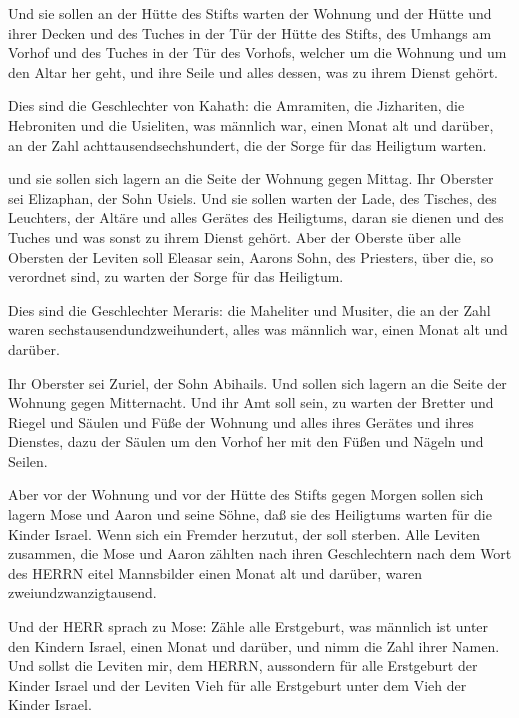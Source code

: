  Und sie sollen an der Hütte des Stifts warten der Wohnung
und der Hütte und ihrer Decken und des Tuches in der Tür der Hütte des
Stifts,  des Umhangs am Vorhof und des Tuches in der Tür
des Vorhofs, welcher um die Wohnung und um den Altar her geht, und ihre
Seile und alles dessen, was zu ihrem Dienst gehört.

 Dies sind die Geschlechter von Kahath: die Amramiten, die
Jizhariten, die Hebroniten und die Usieliten,  was männlich
war, einen Monat alt und darüber, an der Zahl achttausendsechshundert,
die der Sorge für das Heiligtum warten.

 und sie sollen sich lagern an die Seite der Wohnung gegen
Mittag.  Ihr Oberster sei Elizaphan, der Sohn Usiels.
 Und sie sollen warten der Lade, des Tisches, des
Leuchters, der Altäre und alles Gerätes des Heiligtums, daran sie dienen
und des Tuches und was sonst zu ihrem Dienst gehört.  Aber
der Oberste über alle Obersten der Leviten soll Eleasar sein, Aarons
Sohn, des Priesters, über die, so verordnet sind, zu warten der Sorge
für das Heiligtum.

 Dies sind die Geschlechter Meraris: die Maheliter und
Musiter,  die an der Zahl waren sechstausendundzweihundert,
alles was männlich war, einen Monat alt und darüber.

 Ihr Oberster sei Zuriel, der Sohn Abihails. Und sollen
sich lagern an die Seite der Wohnung gegen Mitternacht. 
Und ihr Amt soll sein, zu warten der Bretter und Riegel und Säulen und
Füße der Wohnung und alles ihres Gerätes und ihres Dienstes,
 dazu der Säulen um den Vorhof her mit den Füßen und Nägeln
und Seilen.

 Aber vor der Wohnung und vor der Hütte des Stifts gegen
Morgen sollen sich lagern Mose und Aaron und seine Söhne, daß sie des
Heiligtums warten für die Kinder Israel. Wenn sich ein Fremder herzutut,
der soll sterben.  Alle Leviten zusammen, die Mose und
Aaron zählten nach ihren Geschlechtern nach dem Wort des HERRN eitel
Mannsbilder einen Monat alt und darüber, waren zweiundzwanzigtausend.

 Und der HERR sprach zu Mose: Zähle alle Erstgeburt, was
männlich ist unter den Kindern Israel, einen Monat und darüber, und nimm
die Zahl ihrer Namen.  Und sollst die Leviten mir, dem
HERRN, aussondern für alle Erstgeburt der Kinder Israel und der Leviten
Vieh für alle Erstgeburt unter dem Vieh der Kinder Israel.

